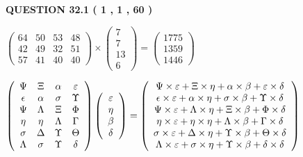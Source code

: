\documentclass[12pt]{article}
\begin{document}
   
   
   
  
  
{\textbf{\large{QUESTION
32.1 
 (           1 ,           1 ,          60 )
}}}

 
$\left( \begin{array}{ccccccccccccccc}
          64  & 
          50  & 
          53  & 
          48  \\ 
          42  & 
          49  & 
          32  & 
          51  \\ 
          57  & 
          41  & 
          40  & 
          40
\end{array}\right) \times
\left( \begin{array}{c}
           7  \\ 
           7  \\ 
          13  \\ 
           6
\end{array}\right)  =
\left( \begin{array}{c}
        1775  \\ 
        1359  \\ 
        1446
\end{array}\right)  $
 
$  %
 \left( \begin{array}
 {
 c
 c
 c
 c
 }
 \Psi & 
                    \Xi & 
 \alpha & 
 \varepsilon \\ 
 \epsilon & 
 \alpha & 
 \sigma & 
 \Upsilon \\ 
 \Psi & 
 \Lambda & 
                    \Xi & 
 \Phi \\ 
 \eta & 
 \eta & 
 \Lambda & 
 \Gamma \\ 
 \sigma & 
 \Delta & 
 \Upsilon & 
 \Theta \\ 
 \Lambda & 
 \sigma & 
 \Upsilon & 
 \delta
 \end{array} \right)
 \left( \begin{array}
 {
 c
 }
 \varepsilon \\ 
 \eta \\ 
 \beta \\ 
 \delta
 \end{array} \right)
=
 \left( \begin{array}
 {
 c
 }
  \Psi \times  \varepsilon +                     \Xi \times  \eta +  \alpha \times  \beta +  \varepsilon \times  \delta \\ 
  \epsilon \times  \varepsilon +  \alpha \times  \eta +  \sigma \times  \beta +  \Upsilon \times  \delta \\ 
  \Psi \times  \varepsilon +  \Lambda \times  \eta +                     \Xi \times  \beta +  \Phi \times  \delta \\ 
  \eta \times  \varepsilon +  \eta \times  \eta +  \Lambda \times  \beta +  \Gamma \times  \delta \\ 
  \sigma \times  \varepsilon +  \Delta \times  \eta +  \Upsilon \times  \beta +  \Theta \times  \delta \\ 
  \Lambda \times  \varepsilon +  \sigma \times  \eta +  \Upsilon \times  \beta +  \delta \times  \delta
 \end{array} \right)
$
 
\end{document}
